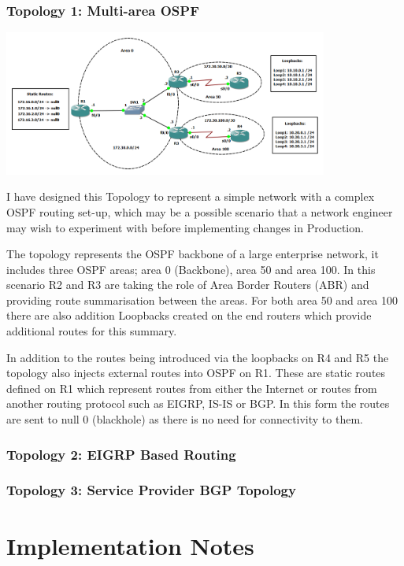 \documentclass[11pt]{report}
\begin{document}
\subsection{Topology 1: Multi-area OSPF}

\begin{center}
\includegraphics[width=0.8\textwidth]{OSPF-Topology.png}
\end{center}

I have designed this Topology to represent a simple network with a complex OSPF routing set-up, which may be a possible scenario that a network engineer may wish to experiment with before implementing changes in Production.

The topology represents the OSPF backbone of a large enterprise network, it includes three OSPF areas; area 0 (Backbone), area 50 and area 100. In this scenario R2 and R3 are taking the role of Area Border Routers (ABR) and providing route summarisation between the areas. For both area 50 and area 100 there are also addition Loopbacks created on the end routers which provide additional routes for this summary.

In addition to the routes being introduced via the loopbacks on R4 and R5 the topology also injects external routes into OSPF on R1. These are static routes defined on R1 which represent routes from either the Internet or routes from another routing protocol such as EIGRP, IS-IS or BGP. In this form the routes are sent to null 0 (blackhole) as there is no need for connectivity to them.

\subsection{Topology 2: EIGRP Based Routing}

\subsection{Topology 3: Service Provider BGP Topology}

\chapter*{Implementation Notes}
\end{document}
